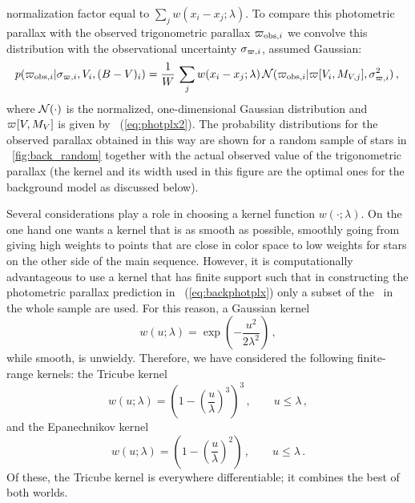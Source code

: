 normalization factor equal to $\sum_j w(x_i-x_j;\lambda)$. To compare
this photometric parallax with the observed trigonometric parallax
$\varpi_{\mathrm{obs},i}$ we convolve this distribution with the
observational uncertainty $\sigma_{\varpi,i}$, assumed Gaussian:
\begin{equation}\label{eq:backphotplx}
p(\varpi_{\mathrm{obs},i} | \sigma_{\varpi,i},V_i,(B-V)_i)
= \frac{1}{W}\,\sum_j
w(x_i-x_j;\lambda)\,\mathcal{N}(\varpi_{\mathrm{obs},i} |
\varpi[V_i,M_{V,j}],\sigma_{\varpi,i}^2 )\,,\\
\end{equation}
where $\mathcal{N}(\cdot)$ is the normalized, one-dimensional Gaussian
distribution and $\varpi[V,M_V]$ is given by
\eqnname~(\ref{eq:photplx2}). The probability distributions for the
observed parallax obtained in this way are shown for a random sample
of stars in \figurename~\ref{fig:back_random} together with the actual
observed value of the trigonometric parallax (the kernel and its width
used in this figure are the optimal ones for the background model as
discussed below).

Several considerations play a role in choosing a kernel function
$w(\cdot;\lambda)$. On the one hand one wants a kernel that is as
smooth as possible, smoothly going from giving high weights to points
that are close in color space to low weights for stars on the other
side of the main sequence. However, it is computationally advantageous
to use a kernel that has finite support such that in constructing the
photometric parallax prediction in \eqnname~(\ref{eq:backphotplx})
only a subset of the \nstarsms\ in the whole sample are used. For this
reason, a Gaussian kernel
\begin{equation}\label{eq:gaussiankernel}
w(u;\lambda) = \exp\left(-\frac{u^2}{2\lambda^2}\right)\,,
\end{equation}
while smooth, is unwieldy. Therefore, we have considered the following
finite-range kernels: the Tricube kernel
\begin{equation}\label{eq:tricube}
w(u;\lambda) =  \left(1-\left(\frac{u}{\lambda}\right)^3\right)^3\,,\qquad u \leq \lambda\,,
\end{equation}
and the Epanechnikov kernel
\begin{equation}\label{eq:epanechnikov}
w(u;\lambda) = (1-\left(\frac{u}{\lambda}\right)^2)\,, \qquad u \leq \lambda\,.
\end{equation}
Of these, the Tricube kernel is everywhere differentiable; it combines
the best of both worlds.

